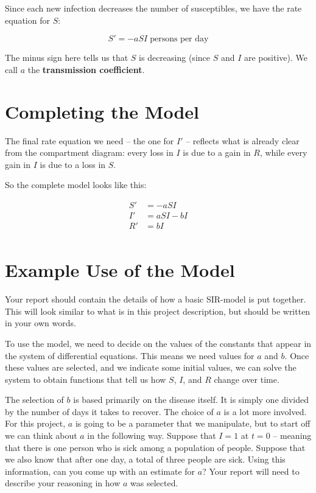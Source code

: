 \documentclass
[justified,nohyper]
{tufte-handout}
\begin{document}
Since each new infection decreases the number of susceptibles, we have the rate 
equation for $S$:

\[
    S' = -aSI\;\text{persons per day}
\]

The minus sign here tells us that $S$ is decreasing (since $S$ and $I$ are 
positive). We call $a$ the \textbf{transmission coefficient}.


\section{Completing the Model}
The final rate equation we need -- the one for $I'$ -- reflects what is already 
clear from the compartment diagram: every loss in $I$ is due to a gain in $R$, 
while every gain in $I$ is due to a loss in $S$.

So the complete model looks like this:

\begin{align*}
    S' &= -aSI \\
    I' &= aSI - bI \\
    R' &= bI \\
\end{align*}


\section{Example Use of the Model}
Your report should contain the details of how a basic SIR-model is put together.
This will look similar to what is in this project description, but should be
written in your own words.

To use the model, we need to decide on the values of the constants that appear
in the system of differential equations. This means we need values for $a$ and
$b$. Once these values are selected, and we indicate some initial values,
we can solve the system to obtain functions
that tell us how $S$, $I$, and $R$ change over time.

The selection of $b$ is based primarily on the disease itself. It is simply
one divided by the number of days it takes to recover. The choice of $a$ is a lot
more involved. For this project, $a$ is going to be a parameter that we manipulate,
but to start off we can think about $a$ in the following way. Suppose that $I=1$
at $t=0$ -- meaning that there is one person who is sick among a population of people.
Suppose that we also know that after one day, a total of three people are sick.
Using this information, can you come up with an estimate for $a$? Your report will
need to describe your reasoning in how $a$ was selected.
\end{document}
